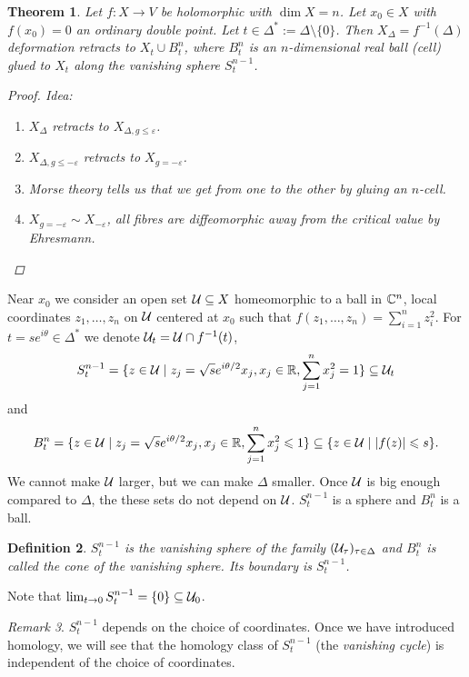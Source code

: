 \documentclass[A4paper, british]{amsart}
\theoremstyle{darkgreentheorem}
\newtheorem{thm}{Theorem}[section]
\theoremstyle{darkbluedefinition}
\newtheorem{defn}[thm]{Definition}
\theoremstyle{darkredexample}
\theoremstyle{remark}
\newtheorem{rem}[thm]{Remark}
\newcommand{\1}{\mathbbm{1}}
\newcommand{\sub}{\subseteq}
\begin{document}
\begin{thm}
    Let $f\colon X\to V$ be holomorphic with $\dim{X}=n$.
    Let $x_{0}\in X$ with $f(x_{0})=0$ an ordinary double point.
    Let $t\in \Delta^{*}:=\Delta\setminus \{0\}$.
    Then $X_{\Delta}=f^{-1}(\Delta)$ deformation retracts to $X_{t}\cup B_{t}^{n}$, where $B_{t}^{n}$ is an $n$-dimensional real ball (cell) glued to $X_{t}$ along the \textit{vanishing sphere} $S_{t}^{n-1}$.
    \begin{proof}
	Idea:
	\begin{enumerate}
	    \item $X_{\Delta}$ retracts to $X_{\Delta,g\leqslant \varepsilon}$.
	    \item $X_{\Delta,g\leqslant -\varepsilon}$ retracts to $X_{g=-\varepsilon}$.
	    \item Morse theory tells us that we get from one to the other by gluing an $n$-cell.
	    \item $X_{g=-\varepsilon}\sim X_{-\varepsilon}$, all fibres are diffeomorphic away from the critical value by Ehresmann.
	\end{enumerate}
    \end{proof}
\end{thm}

Near $x_{0}$ we consider an open set $\U\sub X$ homeomorphic to a ball in $\mathbb{C}^{n}$, local coordinates $z_{1},\ldots,z_{n}$ on $\mathcal{U}$ centered at $x_{0}$ such that $f(z_{1},\ldots,z_{n})=\sum_{i=1}^{n}z_{i}^{2}$.
For $t=se^{i\theta}\in \Delta^{*}$ we denote $\mathcal{U}_{t}=\mathcal{U}\cap f^{-1}(t)$,
\[ S_{t}^{n-1}=\{ z\in \U\mid z_{j}=\sqrt{s}e^{i\theta/2}x_{j}, x_{j}\in \R, \sum_{j=1}^{n}x_{j}^{2}=1 \}\sub \U_{t} \]
and
\[ B_{t}^{n}=\{ z\in \U \mid z_{j}=\sqrt{s}e^{i\theta/2}x_{j}, x_{j}\in \R, \sum_{j=1}^{n}x_{j}^{2}\leqslant 1 \}\sub \{ z\in \U\mid |f(z)|\leqslant s\}. \]
We cannot make $\mathcal{U}$ larger, but we can make $\Delta$ smaller.
Once $\mathcal{U}$ is big enough compared to $\Delta$, the these sets do not depend on $\mathcal{U}$.
$S_{t}^{n-1}$ is a sphere and $B_{t}^{n}$ is a ball.

\begin{defn}
    $S_{t}^{n-1}$ is the \textit{vanishing sphere} of the family $(\mathcal{U}_{\tau})_{\tau\in \Delta}$ and $B_{t}^{n}$ is called the \textit{cone of the vanishing sphere}.
    Its boundary is $S_{t}^{n-1}$.
\end{defn}
Note that $\lim_{t\to 0}S_{t}^{n-1}=\{0\}\sub \U_{0}$.

\begin{rem}
    $S_{t}^{n-1}$ depends on the choice of coordinates. 
    Once we have introduced homology, we will see that the homology class of $S_{t}^{n-1}$ (the \textit{vanishing cycle}) is independent of the choice of coordinates.
\end{rem}
\end{document}
